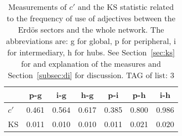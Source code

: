 \begin{table}[h!]
\begin{center}
\caption{Measurements of $c'$ and the KS statistic related to the frequency of use of adjectives between the Erd\"os sectors and the whole network. The abbreviations are: g for global, p for peripheral, i for intermediary, h for hubs. See Section~\ref{sec:ks} for and explanation of the measures and Section~\ref{subsec:di} for discussion. TAG of list: 3}
\begin{tabular}{l | c c c c c c}
{\bf } & {\bf p-g} & {\bf i-g} & {\bf h-g} & {\bf p-i} & {\bf p-h} & {\bf i-h} \\\hline
$c'$ & 0.461  & 0.564  & 0.617  & 0.385  & 0.800  & 0.986 \\
KS & 0.011  & 0.010  & 0.010  & 0.011  & 0.021  & 0.020 \\
\end{tabular}
\end{center}
\end{table}

